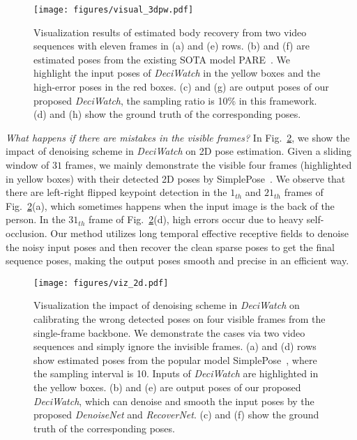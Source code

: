 \documentclass[runningheads]{llncs}
\newcommand{\name}{\emph{DeciWatch}\xspace}
\begin{document}
\begin{figure}[h]	
\centering
 	
 		\begin{minipage}[t]{0.98\linewidth}
 			\centering         
 			\texttt{[image: figures/visual\_3dpw.pdf]}   
 		\end{minipage}
     	
    	
\caption{Visualization results of estimated body recovery from two video sequences with eleven frames in (a) and (e) rows. (b) and (f) are estimated poses from the existing SOTA model PARE~\cite{kocabas2021pare}. We highlight the input poses of \name in the yellow boxes and the high-error poses in the red boxes. (c) and (g) are output poses of our proposed \name, the sampling ratio is 10\% in this framework. (d) and (h) show the ground truth of the corresponding poses. }
\label{fig:supp_viz_1} 
\end{figure} 




\emph{What happens if there are mistakes in the visible frames?} In Fig.~\ref{fig:supp_viz2}, we show the impact of denoising scheme in \name on 2D pose estimation. Given a sliding window of $31$ frames, we mainly demonstrate the visible four frames (highlighted in yellow boxes) with their detected 2D poses by SimplePose~\cite{xiao2018simple}. We observe that there are left-right flipped keypoint detection in the $1_{th}$ and $21_{th}$ frames of Fig.~\ref{fig:supp_viz2}(a), which sometimes happens when the input image is the back of the person. In the $31_{th}$ frame of Fig.~\ref{fig:supp_viz2}(d), high errors occur due to heavy self-occlusion. Our method utilizes long temporal effective receptive fields to denoise the noisy input poses and then recover the clean sparse poses to get the final sequence poses, making the output poses smooth and precise in an efficient way.


\begin{figure}[h]	
\centering
 	
 		\begin{minipage}[t]{0.98\linewidth}
 			\centering         
 			\texttt{[image: figures/viz\_2d.pdf]}   
 		\end{minipage}     	
    	
\caption{Visualization the impact of denoising scheme in \name on calibrating the wrong detected poses on four visible frames from the single-frame backbone. We demonstrate the cases via two video sequences and simply ignore the invisible frames. (a) and (d) rows show estimated poses from the popular model SimplePose~\cite{xiao2018simple}, where the sampling interval is 10. Inputs of \name are highlighted in the yellow boxes. (b) and (e) are  output poses of our proposed \name, which can denoise and smooth the input poses by the proposed \emph{DenoiseNet} and \emph{RecoverNet}. (c) and (f) show the ground truth of the corresponding poses. }
\label{fig:supp_viz2} 
\end{figure} 
\end{document}
